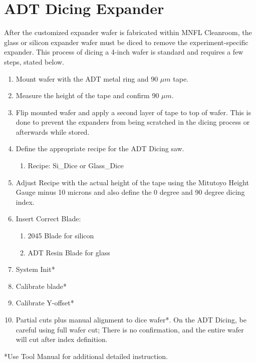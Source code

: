 \section{ADT Dicing Expander}

\qquad After the customized expander wafer is fabricated within MNFL Cleanroom, the glass or silicon expander wafer must be diced to remove the experiment-specific expander. This process of dicing a 4-inch wafer is standard and requires a few steps, stated below. 

\begin{enumerate}
    \item Mount wafer with the ADT metal ring and 90 $\mu m$ tape.
    \item Measure the height of the tape and confirm 90 $\mu m$.
    \item Flip mounted wafer and apply a second layer of tape to top of wafer. This is done to prevent the expanders from being scratched in the dicing process or afterwards while stored.
    \item Define the appropriate recipe for the ADT Dicing saw.
        \begin{enumerate}
            \item Recipe: Si\_Dice or Glass\_Dice
        \end{enumerate}
    \item Adjust Recipe with the actual height of the tape using the Mitutoyo Height Gauge minus 10 microns and also define the 0 degree and 90 degree dicing index.	
    \item Insert Correct Blade:
        \begin{enumerate}
            \item 2045 Blade for silicon
            \item ADT Resin Blade for glass
        \end{enumerate}
    \item System Init*
    \item Calibrate blade*
    \item Calibrate Y-offset*
    \item Partial cuts plus manual alignment to dice wafer*. On the ADT Dicing, be careful using full wafer cut; There is no confirmation, and the entire wafer will cut after index definition.
\end{enumerate}
*Use Tool Manual for additional detailed instruction.

